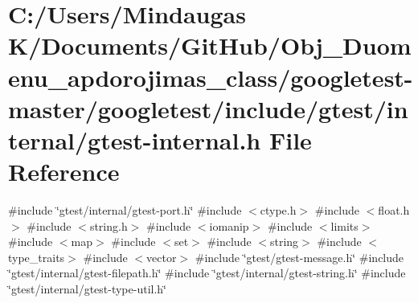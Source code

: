 \hypertarget{googletest-master_2googletest_2include_2gtest_2internal_2gtest-internal_8h}{}\section{C\+:/\+Users/\+Mindaugas K/\+Documents/\+Git\+Hub/\+Obj\+\_\+\+Duomenu\+\_\+apdorojimas\+\_\+class/googletest-\/master/googletest/include/gtest/internal/gtest-\/internal.h File Reference}
\label{googletest-master_2googletest_2include_2gtest_2internal_2gtest-internal_8h}
{\ttfamily \#include \char`\"{}gtest/internal/gtest-\/port.\+h\char`\"{}}\newline
{\ttfamily \#include $<$ctype.\+h$>$}\newline
{\ttfamily \#include $<$float.\+h$>$}\newline
{\ttfamily \#include $<$string.\+h$>$}\newline
{\ttfamily \#include $<$iomanip$>$}\newline
{\ttfamily \#include $<$limits$>$}\newline
{\ttfamily \#include $<$map$>$}\newline
{\ttfamily \#include $<$set$>$}\newline
{\ttfamily \#include $<$string$>$}\newline
{\ttfamily \#include $<$type\+\_\+traits$>$}\newline
{\ttfamily \#include $<$vector$>$}\newline
{\ttfamily \#include \char`\"{}gtest/gtest-\/message.\+h\char`\"{}}\newline
{\ttfamily \#include \char`\"{}gtest/internal/gtest-\/filepath.\+h\char`\"{}}\newline
{\ttfamily \#include \char`\"{}gtest/internal/gtest-\/string.\+h\char`\"{}}\newline
{\ttfamily \#include \char`\"{}gtest/internal/gtest-\/type-\/util.\+h\char`\"{}}\newline
